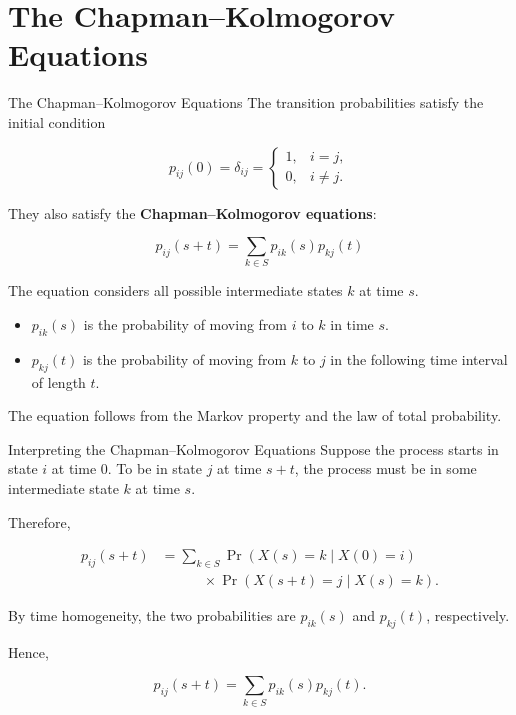 \documentclass[
  ignorenonframetext,
  aspectratio=169,
]{beamer}
\providecommand{\tightlist}{%
  \setlength{\itemsep}{0pt}\setlength{\parskip}{0pt}}
\begin{document}
\section{The Chapman--Kolmogorov
Equations}\label{the-chapmankolmogorov-equations}

\begin{frame}{The Chapman--Kolmogorov Equations}
\protect{}\label{the-chapmankolmogorov-equations-1}
The transition probabilities satisfy the initial condition

\[
p_{ij}(0)=\delta_{ij}
=
\begin{cases}
1, & i=j,\\
0, & i\neq j.
\end{cases}
\]

They also satisfy the \textbf{Chapman--Kolmogorov equations}:

\[
\boxed{
p_{ij}(s+t)
=
\sum_{k\in S}p_{ik}(s)p_{kj}(t)
}
\]

The equation considers all possible intermediate states \(k\) at time
\(s\).

\begin{itemize}
\tightlist
\item
  \(p_{ik}(s)\) is the probability of moving from \(i\) to \(k\) in time
  \(s\).
\item
  \(p_{kj}(t)\) is the probability of moving from \(k\) to \(j\) in the
  following time interval of length \(t\).
\end{itemize}

The equation follows from the Markov property and the law of total
probability.
\end{frame}

\begin{frame}{Interpreting the Chapman--Kolmogorov Equations}
\protect{}\label{interpreting-the-chapmankolmogorov-equations}
Suppose the process starts in state \(i\) at time \(0\). To be in state
\(j\) at time \(s+t\), the process must be in some intermediate state
\(k\) at time \(s\).

Therefore,

\[
\begin{aligned}
p_{ij}(s+t)
&=\sum_{k\in S}
\Pr(X(s)=k\mid X(0)=i)\\
&\qquad\quad\times
\Pr(X(s+t)=j\mid X(s)=k).
\end{aligned}
\]

By time homogeneity, the two probabilities are \(p_{ik}(s)\) and
\(p_{kj}(t)\), respectively.

Hence,

\[
p_{ij}(s+t)
=
\sum_{k\in S}p_{ik}(s)p_{kj}(t).
\]
\end{frame}
\end{document}
